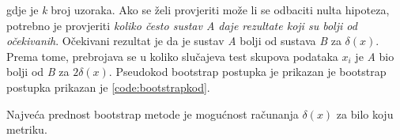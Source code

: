 gdje je \textit{k} broj uzoraka. Ako se želi provjeriti može li se odbaciti nulta hipoteza, potrebno je provjeriti \textit{koliko često sustav A daje rezultate koji su bolji od očekivanih}. Očekivani rezultat je da je sustav \textit{A} bolji od sustava \textit{B} za $\delta(x)$. Prema tome, prebrojava se u koliko slučajeva test skupova podataka $x_i$ je \textit{A} bio bolji od \textit{B} za $2\delta(x)$. Pseudokod bootstrap postupka je prikazan je \citep{berg2012empirical} bootstrap postupka prikazan je \ref{code:bootstrapkod}.

%
Najveća prednost bootstrap metode je mogućnost računanja $\delta(x)$ za bilo koju metriku. 

